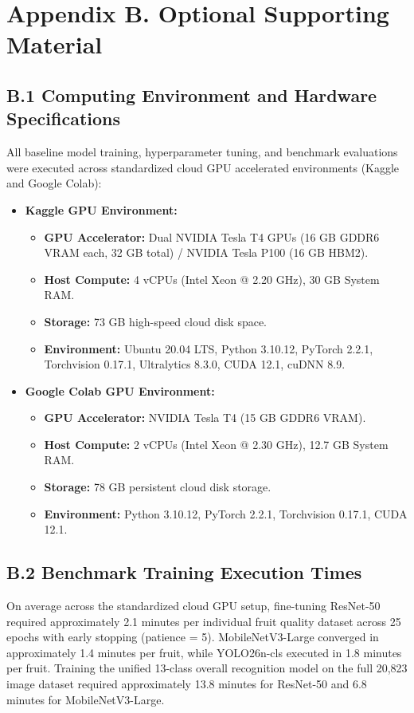 \documentclass[11pt,a4paper]{article}
\begin{document}
\vspace{1.5em}

\section*{Appendix B. Optional Supporting Material}

\subsection*{B.1 Computing Environment and Hardware Specifications}
All baseline model training, hyperparameter tuning, and benchmark evaluations were executed across standardized cloud GPU accelerated environments (Kaggle and Google Colab):

\begin{itemize}[leftmargin=1.5em, itemsep=2pt, topsep=2pt]
    \item \textbf{Kaggle GPU Environment:}
    \begin{itemize}
        \item \textbf{GPU Accelerator:} Dual NVIDIA Tesla T4 GPUs (16 GB GDDR6 VRAM each, 32 GB total) / NVIDIA Tesla P100 (16 GB HBM2).
        \item \textbf{Host Compute:} 4 vCPUs (Intel Xeon @ 2.20 GHz), 30 GB System RAM.
        \item \textbf{Storage:} 73 GB high-speed cloud disk space.
        \item \textbf{Environment:} Ubuntu 20.04 LTS, Python 3.10.12, PyTorch 2.2.1, Torchvision 0.17.1, Ultralytics 8.3.0, CUDA 12.1, cuDNN 8.9.
    \end{itemize}
    \item \textbf{Google Colab GPU Environment:}
    \begin{itemize}
        \item \textbf{GPU Accelerator:} NVIDIA Tesla T4 (15 GB GDDR6 VRAM).
        \item \textbf{Host Compute:} 2 vCPUs (Intel Xeon @ 2.30 GHz), 12.7 GB System RAM.
        \item \textbf{Storage:} 78 GB persistent cloud disk storage.
        \item \textbf{Environment:} Python 3.10.12, PyTorch 2.2.1, Torchvision 0.17.1, CUDA 12.1.
    \end{itemize}
\end{itemize}

\subsection*{B.2 Benchmark Training Execution Times}
On average across the standardized cloud GPU setup, fine-tuning ResNet-50 required approximately 2.1 minutes per individual fruit quality dataset across 25 epochs with early stopping (patience = 5). MobileNetV3-Large converged in approximately 1.4 minutes per fruit, while YOLO26n-cls executed in 1.8 minutes per fruit. Training the unified 13-class overall recognition model on the full 20,823 image dataset required approximately 13.8 minutes for ResNet-50 and 6.8 minutes for MobileNetV3-Large.
\end{document}
